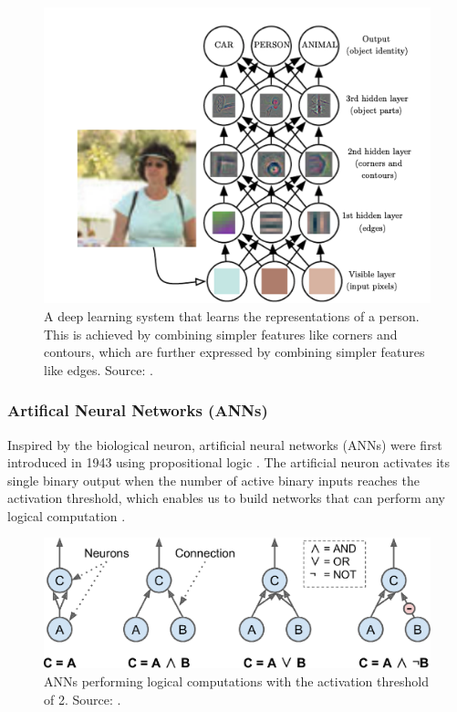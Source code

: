 \documentclass[a4paper, 11pt, oneside]{article}
\begin{document}
  \begin{figure}[ht]
    \begin{center}
      \includegraphics[width=.8\textwidth]{deep_learning.png}
    \end{center}
    \caption{A deep learning system that learns the representations of a person. This is achieved by combining simpler
    features like corners and contours, which are further expressed by combining simpler features like edges. Source:
    \cite{goodfellow2016deep}.}
  \end{figure}

  \subsubsection{Artifical Neural Networks (ANNs)}

  Inspired by the biological neuron, artificial neural networks (ANNs) were first introduced in 1943 using propositional
  logic \cite{mcculloch1943logical}. The artificial neuron activates its single binary output when the number of active
  binary inputs reaches the activation threshold, which enables us to build networks that can perform any logical
  computation \cite{geron2019hands, mcculloch1943logical}.

  \begin{figure}[ht]
    \begin{center}
      \includegraphics[width=.8\textwidth]{ann_logic_computations.png}
    \end{center}
    \caption{ANNs performing logical computations with the activation threshold of 2. Source: \cite{geron2019hands}.}
  \end{figure}
\end{document}
